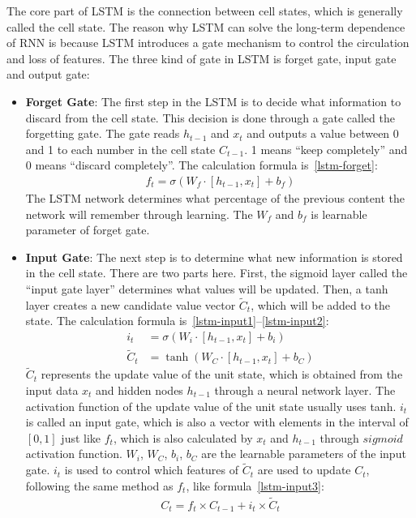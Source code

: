 The core part of LSTM is the connection between cell states, which is generally called the cell state. The reason why LSTM can solve the long-term dependence of RNN is because LSTM introduces a gate mechanism to control the circulation and loss of features. The three kind of gate in LSTM is forget gate, input gate and output gate:
\begin{itemize}
	\item \textbf{Forget Gate}: The first step in the LSTM is to decide what information to discard from the cell state. This decision is done through a gate called the forgetting gate. The gate reads \(h_{t-1}\) and \(x_t\) and outputs a value between 0 and 1 to each number in the cell state \(C_{t-1}\). 1 means ``keep completely'' and 0 means ``discard completely''. The calculation formula is~\ref{lstm-forget}:
	      \begin{align}
		      f_{t}=\sigma(W_{f} \cdot[h_{t-1}, x_{t}]+b_{f}) \label{lstm-forget}
	      \end{align}
	      The LSTM network determines what percentage of the previous content the network will remember through learning. The \(W_f\) and \(b_f\) is learnable parameter of forget gate.
	\item \textbf{Input Gate}: The next step is to determine what new information is stored in the cell state. There are two parts here. First, the sigmoid layer called the ``input gate layer'' determines what values will be updated. Then, a tanh layer creates a new candidate value vector \(\widetilde{C}_t\), which will be added to the state. The calculation formula is~\ref{lstm-input1}--\ref{lstm-input2}:
	      \begin{align}
		      i_{t}         & =\sigma(W_{i} \cdot[h_{t-1}, x_{t}]+b_{i}) \label{lstm-input1} \\
		      \tilde{C}_{t} & =\tanh (W_{C} \cdot[h_{t-1}, x_{t}]+b_{C}) \label{lstm-input2}
	      \end{align}
	      \(\tilde{C}_{t}\) represents the update value of the unit state, which is obtained from the input data \(x_t\) and hidden nodes \(h_{t-1}\) through a neural network layer. The activation function of the update value of the unit state usually uses tanh. \(i_t\) is called an input gate, which is also a vector with elements in the interval of \([0,1]\) just like \(f_t\), which is also calculated by \(x_t\) and \(h_{t-1}\) through \(sigmoid\)activation function. \(W_i\), \(W_C\), \(b_i\), \(b_C\) are the learnable parameters of the input gate. \(i_t\) is used to control which features of \(\tilde{C}_{t}\) are used to update \(C_t\), following the same method as \(f_t\), like formula~\ref{lstm-input3}:
	      \begin{align}
		      C_{t}=f_{t} \times C_{t-1}+i_{t} \times \tilde{C}_{t} \label{lstm-input3}
	      \end{align}


\end{itemize}
